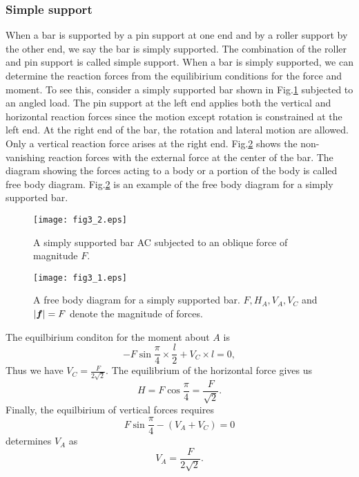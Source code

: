 \documentclass[10pt,a4j]{article}
\begin{document}
\subsubsection{Simple support}
When a bar is supported by a pin support at one end and by a roller 
support by the other end, we say the bar is simply supported. 
The combination of the roller and pin support is called simple support. 
When a bar is simply supported, we can determine the reaction forces 
from the equilibirium conditions for the force and moment. 
To see this, consider a simply supported bar shown in Fig.\ref{fig:fig3_2}
subjected to an angled load.
The pin support at the left end applies both the vertical and horizontal reaction forces 
since the motion except rotation is constrained at the left end.
At the right end of the bar, the rotation and lateral motion are allowed.
Only a vertical reaction force arises at the right end. 
Fig.\ref{fig:fig3_1} shows the non-vanishing reaction forces with the external 
force at the center of the bar. The diagram showing the forces acting to a body or 
a portion of the body is called free body diagram. Fig.\ref{fig:fig3_1} is an example 
of the free body diagram for a simply supported bar.
\begin{figure}[h]
	\begin{center}
	\texttt{[image: fig3\_2.eps]} 
	\end{center}
	\caption{A simply supported bar AC subjected to an oblique force of magnitude $F$.}
	\label{fig:fig3_2}
\end{figure}
\begin{figure}[h]
	\begin{center}
	\texttt{[image: fig3\_1.eps]} 
	\end{center}
	\caption{
		A free body diagram for a simply supported bar.
		$F, H_A, V_A, V_C$ and $|\mbox{\boldmath $f$}|=F$ denote the magnitude of forces.
	}
	\label{fig:fig3_1}
\end{figure}
The equilbirium conditon for the moment about $A$ is 
\[
	-F\sin\frac{\pi}{4}\times \frac{l}{2} + V_C\times l =0,
\]
Thus we have $V_C=\frac{F}{2\sqrt{2}}$. The equilibrium of the horizontal force 
gives us 
\[
	H=F\cos\frac{\pi}{4}=\frac{F}{\sqrt{2}}.
\]
Finally, the equilbirium of vertical forces requires 
\[
	F\sin\frac{\pi}{4} -(V_A+V_C)=0
\]
determines $V_A$ as 
\[
	V_A=\frac{F}{2\sqrt{2}}.
\]
\end{document}
